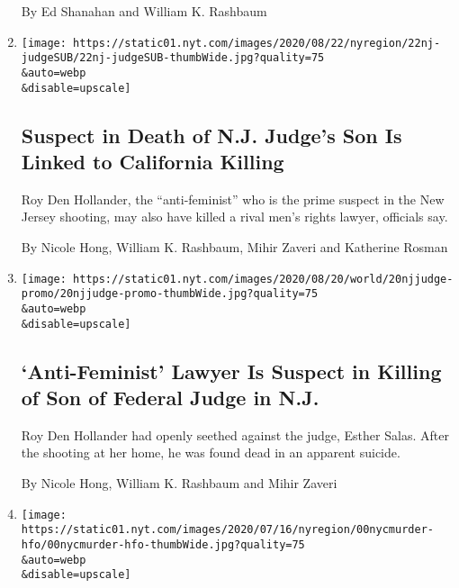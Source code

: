 \begin{enumerate}
  By Ed Shanahan and William K. Rashbaum
\item
  \href{/2020/07/22/nyregion/roy-den-hollander-esther-salas.html}{}

  \texttt{[image: https://static01.nyt.com/images/2020/08/22/nyregion/22nj-judgeSUB/22nj-judgeSUB-thumbWide.jpg?quality=75\\\&auto=webp\\\&disable=upscale]}

  \hypertarget{suspect-in-death-of-nj-judges-son-is-linked-to-california-killing}{%
  \subsection{Suspect in Death of N.J. Judge's Son Is Linked to
  California
  Killing}\label{suspect-in-death-of-nj-judges-son-is-linked-to-california-killing}}

  Roy Den Hollander, the ``anti-feminist'' who is the prime suspect in
  the New Jersey shooting, may also have killed a rival men's rights
  lawyer, officials say.

  By Nicole Hong, William K. Rashbaum, Mihir Zaveri and Katherine Rosman
\item
  \href{/2020/07/20/nyregion/esther-salas.html}{}

  \texttt{[image: https://static01.nyt.com/images/2020/08/20/world/20njjudge-promo/20njjudge-promo-thumbWide.jpg?quality=75\\\&auto=webp\\\&disable=upscale]}

  \hypertarget{anti-feminist-lawyer-is-suspect-in-killing-of-son-of-federal-judge-in-nj}{%
  \subsection{`Anti-Feminist' Lawyer Is Suspect in Killing of Son of
  Federal Judge in
  N.J.}\label{anti-feminist-lawyer-is-suspect-in-killing-of-son-of-federal-judge-in-nj}}

  Roy Den Hollander had openly seethed against the judge, Esther Salas.
  After the shooting at her home, he was found dead in an apparent
  suicide.

  By Nicole Hong, William K. Rashbaum and Mihir Zaveri
\item
  \href{/2020/07/17/nyregion/fahim-saleh-suspect-tyrese-devon-haspil.html}{}

  \texttt{[image: https://static01.nyt.com/images/2020/07/16/nyregion/00nycmurder-hfo/00nycmurder-hfo-thumbWide.jpg?quality=75\\\&auto=webp\\\&disable=upscale]}

  \hypertarget{tech-ceos-former-assistant-charged-with-his-grisly-murder}{%
}
\end{enumerate}
